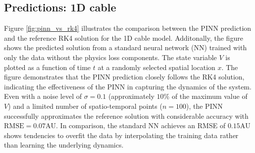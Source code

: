 \subsection{Predictions: 1D cable}
Figure \ref{fig:pinn_vs_rk4} illustrates the comparison between the PINN prediction and the reference RK4 solution for the 1D cable model. Additonally, the figure shows the predicted solution from a standard neural network (NN) trained with only the data without the physics loss components. The state variable \( V \) is plotted as a function of time \( t \) at a randomly selected spatial location \( x \). The figure demonstrates that the PINN prediction closely follows the RK4 solution, indicating the effectiveness of the PINN in capturing the dynamics of the system. Even with a noise level of $\sigma = 0.1 $ (approximately $10\%$ of the maximum value of $V$) and a limited number of spatio-temporal points (\( n=100 \)), the PINN successfully approximates the reference solution with considerable accuracy with $\mathrm{RMSE}=0.07\mathrm{AU}$. In comparison, the standard NN achieves an RMSE of $0.15\mathrm{AU}$ shows tendencies to overfit the data by interpolating the training data rather than learning the underlying dynamics.

